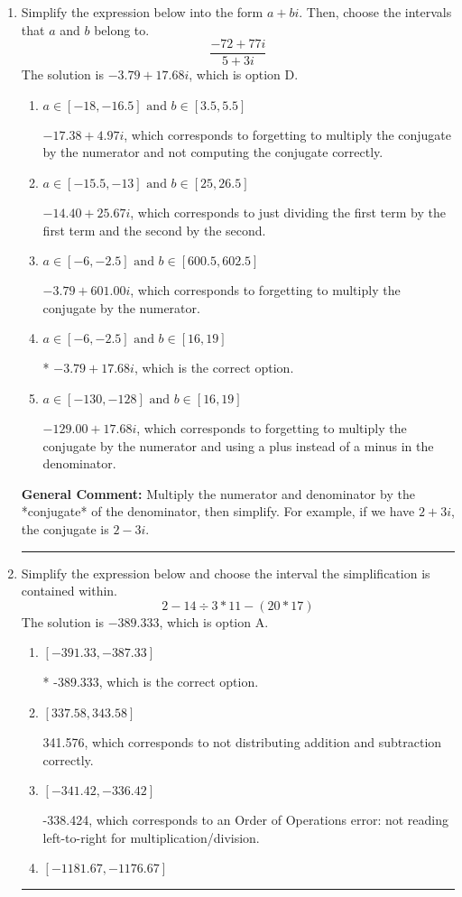 \documentclass{extbook}[14pt]
\newcommand{\litem}[1]{\item #1

\rule{\textwidth}{0.4pt}}
\begin{document}
\begin{enumerate}\litem{
Simplify the expression below into the form $a+bi$. Then, choose the intervals that $a$ and $b$ belong to.
\[ \frac{-72 + 77 i}{5 + 3 i} \]The solution is \( -3.79  + 17.68 i \), which is option D.\begin{enumerate}[label=\Alph*.]
\item \( a \in [-18, -16.5] \text{ and } b \in [3.5, 5.5] \)

 $-17.38  + 4.97 i$, which corresponds to forgetting to multiply the conjugate by the numerator and not computing the conjugate correctly.
\item \( a \in [-15.5, -13] \text{ and } b \in [25, 26.5] \)

 $-14.40  + 25.67 i$, which corresponds to just dividing the first term by the first term and the second by the second.
\item \( a \in [-6, -2.5] \text{ and } b \in [600.5, 602.5] \)

 $-3.79  + 601.00 i$, which corresponds to forgetting to multiply the conjugate by the numerator.
\item \( a \in [-6, -2.5] \text{ and } b \in [16, 19] \)

* $-3.79  + 17.68 i$, which is the correct option.
\item \( a \in [-130, -128] \text{ and } b \in [16, 19] \)

 $-129.00  + 17.68 i$, which corresponds to forgetting to multiply the conjugate by the numerator and using a plus instead of a minus in the denominator.
\end{enumerate}

\textbf{General Comment:} Multiply the numerator and denominator by the *conjugate* of the denominator, then simplify. For example, if we have $2+3i$, the conjugate is $2-3i$.
}
\litem{
Simplify the expression below and choose the interval the simplification is contained within.
\[ 2 - 14 \div 3 * 11 - (20 * 17) \]The solution is \( -389.333 \), which is option A.\begin{enumerate}[label=\Alph*.]
\item \( [-391.33, -387.33] \)

* -389.333, which is the correct option.
\item \( [337.58, 343.58] \)

 341.576, which corresponds to not distributing addition and subtraction correctly.
\item \( [-341.42, -336.42] \)

 -338.424, which corresponds to an Order of Operations error: not reading left-to-right for multiplication/division.
\item \( [-1181.67, -1176.67] \)


\end{enumerate}}
\end{enumerate}
\end{document}
